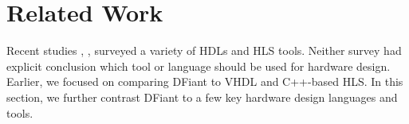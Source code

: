 \section{Related Work}
\label{sec:related_work}

Recent studies \cite{Kapre2016}, \cite{Nane2016}, \cite{Windh2015} surveyed a variety of HDLs and HLS tools. Neither survey had explicit conclusion which tool or language should be used for hardware design. Earlier, we focused on comparing DFiant to VHDL and C++-based HLS. In this section, we further contrast DFiant to a few key hardware design languages and tools.






